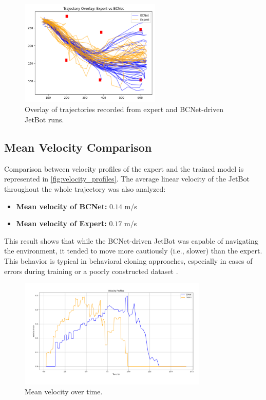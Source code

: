 \begin{figure}[htbp]
  \centering
  \includegraphics[width=0.6\textwidth]{Images/Evaluation/trajectory_overlay.png}
  \caption{Overlay of trajectories recorded from expert and BCNet-driven JetBot runs.}
  \label{fig:trajectory_overlay}
\end{figure}

\subsection{Mean Velocity Comparison}

Comparison between velocity profiles of the expert and the trained model is represented in \autoref{fig:velocity_profiles}. The average linear velocity of the JetBot throughout the whole trajectory was also analyzed:

\begin{itemize}
  \item \textbf{Mean velocity of BCNet:} $0.14$ m/s
  \item \textbf{Mean velocity of Expert:} $0.17$ m/s
\end{itemize}

This result shows that while the BCNet-driven JetBot was capable of navigating the environment, it tended to move more cautiously (i.e., slower) than the expert. This behavior is typical in behavioral cloning approaches, especially in cases of errors during training or a poorly constructed dataset \autocite{bühler2020drivingghostsbehavioralcloning}.

\begin{figure}[H]
  \centering
  \includegraphics[width=0.8\textwidth]{Images/Evaluation/velocity_profiles.png}
  \caption{Mean velocity over time.}
  \label{fig:velocity_profiles}
\end{figure}

